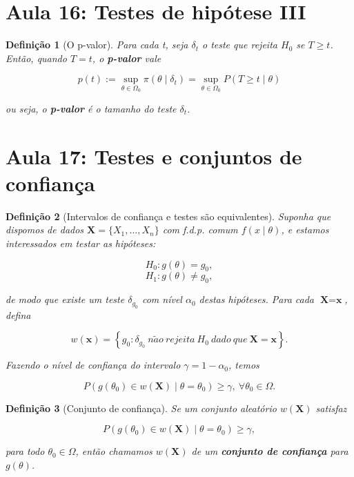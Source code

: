 \documentclass{article}
\newtheorem{definition}{Definição}
\begin{document}
	\section*{Aula 16: Testes de hipótese III}
	\label{s16}
	\begin{definition}[O p-valor]
		Para cada t, seja $\delta_t$ o teste que rejeita $H_0$ se $T \geq t$. Então, quando $T = t$, o \textbf{p-valor} vale
		
		\begin{equation}
			p(t) := \sup_{\theta \in \Omega_0} \pi (\theta \mid \delta_t) = \sup_{\theta \in \Omega_0} P (T \geq t \mid \theta)
		\end{equation}
		
		ou seja, o \textbf{p-valor} é o tamanho do teste $\delta_t$.
	\end{definition}
	
	\section*{Aula 17: Testes e conjuntos de confiança}
	\label{s17}
	\begin{definition}[Intervalos de confiança e testes são equivalentes]
		
		Suponha que dispomos de dados $\textbf{X} = \{ X_1, \ldots, X_n \}$ com f.d.p. comum $f(x \mid \theta)$, e estamos interessados em testar as hipóteses:
		
		$$H_0 : g(\theta) = g_0,$$
		$$H_1 : g(\theta) \neq g_0,$$
		
		de modo que existe um teste $\delta_{g_0}$ com nível $\alpha_0$ destas hipóteses. Para cada $\textbf{X} = \textbf{x}$, defina
		
		$$w(\textbf{x}) = \left\{g_0: \delta_{g_0} \:n\tilde{a}o\:rejeita\: H_0 \:dado\:que\: \textbf{X} = \textbf{x} \right\}.$$
		
		Fazendo o nível de confiança do intervalo $\gamma = 1 - \alpha_0$, temos
		
		$$P(g(\theta_0) \in w(\textbf{X}) \mid \theta = \theta_0) \geq \gamma, \ \forall \theta_0 \in \Omega.$$
	\end{definition}
	
	\begin{definition}[Conjunto de confiança]
		Se um conjunto aleatório $w(\textbf{X})$ satisfaz
		
		$$P(g(\theta_0) \in w(\textbf{X}) \mid \theta = \theta_0) \geq \gamma,$$
		
		para todo $\theta_0 \in \Omega$, então chamamos $w(\textbf{X})$ de um \textbf{conjunto de confiança} para $g(\theta)$.
	\end{definition}
	
\end{document}
